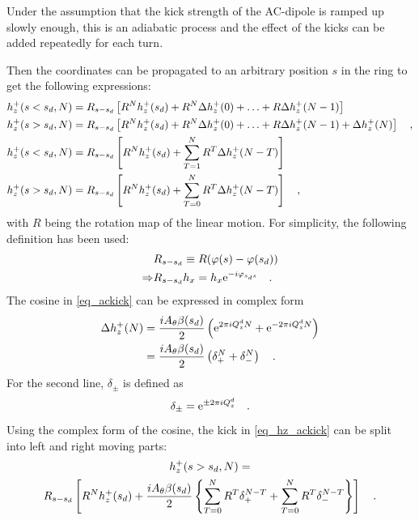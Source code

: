 Under the assumption that the kick strength of the AC-dipole is ramped up slowly enough, this is an
adiabatic process and the effect of the kicks can be added repeatedly for each turn.

Then the coordinates can be propagated to an arbitrary position $s$ in the ring to get the following
expressions:
%
\begin{align}
    h_z^+(s<s_d, N) &= R_{s-s_d}\left[R^N h_z^+(s_d) + R^N\Delta h_z^+(0) + \ldots + R\Delta h_z^+(N-1)\right] \notag\\
    h_z^+(s>s_d, N) &= R_{s-s_d}\left[R^N h_z^+(s_d) + R^N\Delta h_z^+(0) + \ldots + R\Delta h_z^+(N-1) + \Delta h_z^+(N)\right] 
    \quad ,\\
    h_z^+(s<s_d, N) &= R_{s-s_d}\left[R^N h_z^+(s_d) + \sum\limits_{T=1}^N R^T\Delta h_z^+(N-T)\right] \notag\\
    h_z^+(s>s_d, N) &= R_{s-s_d}\left[R^N h_z^+(s_d) + \sum\limits_{T=0}^N R^T\Delta h_z^+(N-T)\right]
    \quad ,
    \label{eq_hz_ackick}
\end{align}
%
with $R$ being the rotation map of the linear motion. For simplicity, the following definition has been used:
%
\begin{align}
    &R_{s-s_d} \equiv R(\varphi(s) - \varphi(s_d))\\
    \Rightarrow &R_{s-s_d} h_x = h_x \text{e}^{-i\varphi_{s_d s}}
    \quad .
\end{align}
%
The cosine in \eqref{eq_ackick} can be expressed in complex form
%
\begin{align}
    \Delta h_z^+(N) &= \frac{iA_\theta\beta(s_d)}{2} \left(
        \text{e}^{2\pi i Q^{d}_{z} N} +
        \text{e}^{-2\pi i Q^{d}_{z} N}
    \right) \notag\\
    &= \frac{iA_\theta\beta(s_d)}{2} \left(
        \delta_+^N + \delta_-^N
    \right)
    \quad .
\end{align}
%
For the second line, $\delta_\pm$ is defined as
%
\begin{equation}
    \delta_\pm = \text{e}^{\pm 2\pi i Q^{d}_{z}}
    \quad .
\end{equation}
%
Using the complex form of the cosine, the kick in \eqref{eq_hz_ackick} can be split into left and right moving parts:
%
\begin{multline}
    h_z^+(s>s_d, N) = \\
    R_{s-s_d}\left[
        R^N h_z^+(s_d) +
        \frac{iA_\theta\beta(s_d)}{2}\left\{
            \sum\limits_{T=0}^N R^T \delta_+^{N-T}
            + \sum\limits_{T=0}^N R^T \delta_-^{N-T}
        \right\}
        \right]
    \quad .
\end{multline}
